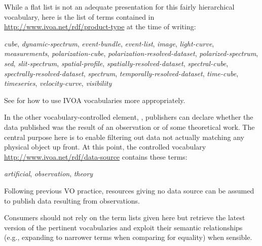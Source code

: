 \documentclass[11pt,a4paper]{ivoa}
\begin{document}
While a flat list is not an adequate presentation for this fairly
hierarchical vocabulary, here is the list of terms contained in
\url{http://www.ivoa.net/rdf/product-type} at the time of writing:

\textsl{cube},
\textsl{dynamic-spectrum},
\textsl{event-bundle},
\textsl{event-list},
\textsl{image},
\textsl{light-curve},
\textsl{measurements},
\textsl{polarization-cube},
\textsl{polarization-resolved-dataset},
\textsl{polarized-spectrum},
\textsl{sed},
\textsl{slit-spectrum},
\textsl{spatial-profile},
\textsl{spatially-resolved-dataset},
\textsl{spectral-cube},
\textsl{spectrally-resolved-dataset},
\textsl{spectrum},
\textsl{temporally-resolved-dataset},
\textsl{time-cube},
\textsl{timeseries},
\textsl{velocity-curve},
\textsl{visibility}

See \citet{2023ivoa.spec.0206D} for how to use IVOA vocabularies more
appropriately.

In the other vocabulary-controlled element, ,
publishers can declare whether the data published was the result of an
observation or of some theoretical work.  The central purpose here is to
enable filtering out data not actually matching any physical object up
front.  At this point, the controlled vocabulary
\url{http://www.ivoa.net/rdf/data-source} contains these terms:

\textsl{artificial},
\textsl{observation},
\textsl{theory}

Following previous VO practice, resources giving no data source can be
assumed to publish data resulting from observations.

Consumers should not rely on the term lists given here but retrieve the
latest version of the pertinent vocabularies and exploit their semantic
relationships (e.g., expanding to narrower terms when comparing for
equality) when sensible.
\end{document}
